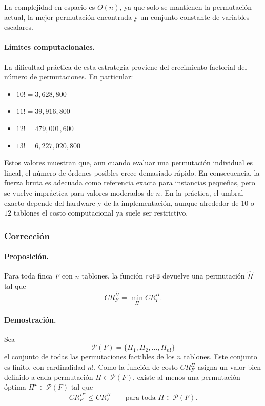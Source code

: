 \documentclass[12pt,a4paper]{article}
\begin{document}
La complejidad en espacio es \(O(n)\), ya que solo se mantienen la permutaci\'on actual, la mejor permutaci\'on encontrada y un conjunto constante de variables escalares.

\paragraph{L\'imites computacionales.}
La dificultad pr\'actica de esta estrategia proviene del crecimiento factorial del n\'umero de permutaciones. En particular:
\begin{itemize}
  \item \(10! = 3{,}628{,}800\)
  \item \(11! = 39{,}916{,}800\)
  \item \(12! = 479{,}001{,}600\)
  \item \(13! = 6{,}227{,}020{,}800\)
\end{itemize}

Estos valores muestran que, aun cuando evaluar una permutaci\'on individual es lineal, el n\'umero de \'ordenes posibles crece demasiado r\'apido. En consecuencia, la fuerza bruta es adecuada como referencia exacta para instancias peque\~nas, pero se vuelve impr\'actica para valores moderados de \(n\). En la pr\'actica, el umbral exacto depende del hardware y de la implementaci\'on, aunque alrededor de \(10\) o \(12\) tablones el costo computacional ya suele ser restrictivo.

\subsubsection{Correcci\'on}

\paragraph{Proposici\'on.}
Para toda finca \(F\) con \(n\) tablones, la funci\'on \texttt{roFB} devuelve una permutaci\'on \(\widehat{\Pi}\) tal que
\[
CR_F^{\widehat{\Pi}}=\min_{\Pi} CR_F^\Pi.
\]

\paragraph{Demostraci\'on.}
Sea
\[
\mathcal{P}(F)=\{\Pi_1,\Pi_2,\dots,\Pi_{n!}\}
\]
el conjunto de todas las permutaciones factibles de los \(n\) tablones. Este conjunto es finito, con cardinalidad \(n!\). Como la funci\'on de costo \(CR_F^\Pi\) asigna un valor bien definido a cada permutaci\'on \(\Pi \in \mathcal{P}(F)\), existe al menos una permutaci\'on \'optima \(\Pi^\star \in \mathcal{P}(F)\) tal que
\[
CR_F^{\Pi^\star}\leq CR_F^\Pi
\qquad
\text{para toda } \Pi \in \mathcal{P}(F).
\]
\end{document}
